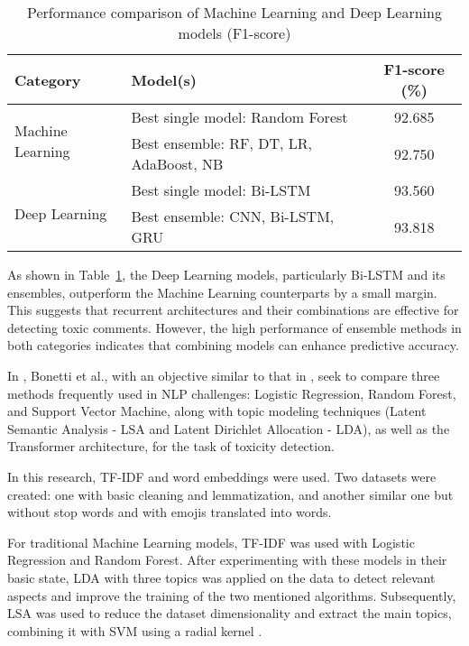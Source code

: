 \begin{table}[!t]
\caption{Performance comparison of Machine Learning and Deep Learning models (F1-score)}
\label{tab:results}
\centering
\begin{tabularx}{\linewidth}{|l|X|c|}
\hline
\textbf{Category} & \textbf{Model(s)} & \textbf{F1-score (\%)} \\ \hline
\multirow{2}{*}{Machine Learning} 
  & Best single model: Random Forest & 92.685 \\ \cline{2-3}
  & Best ensemble: RF, DT, LR, AdaBoost, NB & 92.750 \\ \hline
\multirow{2}{*}{Deep Learning} 
  & Best single model: Bi-LSTM & 93.560 \\ \cline{2-3}
  & Best ensemble: CNN, Bi-LSTM, GRU & 93.818 \\ \hline
\end{tabularx}
\end{table}

\vspace{0.5em}

As shown in Table~\ref{tab:results}, the Deep Learning models, particularly Bi-LSTM and its ensembles, outperform the Machine Learning counterparts by a small margin. This suggests that recurrent architectures and their combinations are effective for detecting toxic comments. However, the high performance of ensemble methods in both categories indicates that combining models can enhance predictive accuracy.

In \cite{hate2022bonetti}, Bonetti et al., with an objective similar to that in \cite{comparison2023toxic}, seek to compare three methods frequently used in NLP challenges: Logistic Regression, Random Forest, and Support Vector Machine, along with topic modeling techniques (Latent Semantic Analysis - LSA and Latent Dirichlet Allocation - LDA), as well as the Transformer architecture, for the task of toxicity detection.

In this research, TF-IDF and word embeddings were used. Two datasets were created: one with basic cleaning and lemmatization, and another similar one but without stop words and with emojis translated into words.

For traditional Machine Learning models, TF-IDF was used with Logistic Regression and Random Forest. After experimenting with these models in their basic state, LDA with three topics was applied on the data to detect relevant aspects and improve the training of the two mentioned algorithms. Subsequently, LSA was used to reduce the dataset dimensionality and extract the main topics, combining it with SVM using a radial kernel \cite{hate2022bonetti}.

